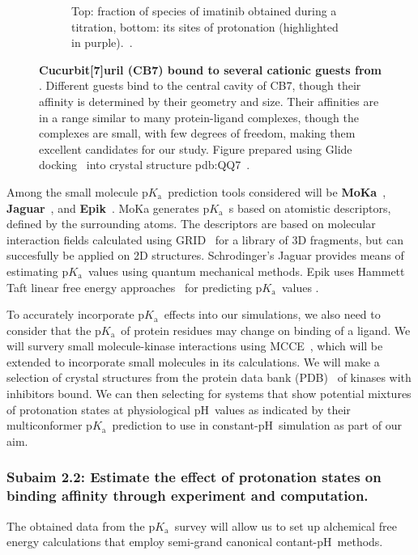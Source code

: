 \documentclass[10pt,final]{article}
\newcommand{\pKa}{p$K_\mathrm{a}$\ }
\newcommand{\pH}{p$\mathrm{H}$\ }
\begin{document}
\begin{figure}[H]
\begin{subfigure}{.5\textwidth}
  \caption{Top: fraction of species of imatinib obtained during a titration, bottom: its sites of protonation (highlighted in purple).~\cite{Szakacs2005a}.}
  \label{fig:imatinib-pKa}
\end{subfigure}
\caption{\textbf{Cucurbit[7]uril (CB7) bound to several cationic guests from \textcite{Cao2013a}}.
Different guests bind to the central cavity of CB7, though their affinity is determined by their geometry and size.
Their affinities are in a range similar to many protein-ligand complexes, though the complexes are small, with few degrees of freedom, making them excellent candidates for our study.
Figure prepared using Glide docking~\cite{Halgren2004a,Friesner2004a,Friesner2006a,Schroedinger2014a} into crystal structure pdb:QQ7~\cite{Feng2004a}.}
\label{figure:kinase-pKa}
\end{figure}


Among the small molecule \pKa prediction tools considered will be \textbf{MoKa}~\cite{Milletti2007a}, \textbf{Jaguar}~\cite{Bochevarov2013a}, and \textbf{Epik}~\cite{Shelley2007a,Greenwood2010a}.
MoKa generates \pKa{}s based on atomistic descriptors, defined by the surrounding atoms. The descriptors are based on molecular interaction fields calculated using GRID~\cite{Goodford1985a} for a library of 3D fragments, but can succesfully be applied on 2D structures.
Schrodinger's Jaguar provides means of estimating \pKa values using quantum mechanical methods.
Epik uses Hammett Taft linear free energy approaches~\cite{Perrin1981a} for predicting \pKa values .

To accurately incorporate \pKa effects into our simulations, we also need to consider that the \pKa of protein residues may change on binding of a ligand.
%
We will survery small molecule-kinase interactions using MCCE~\cite{Song2009a}, which will be extended to incorporate small molecules in its calculations.
%
We will make a selection of crystal structures from the protein data bank (PDB)~\cite{Berman2000a} of kinases with inhibitors bound.
%
We can then selecting for systems that show potential mixtures of protonation states at physiological \pH values as indicated by their multiconformer \pKa prediction to use in constant-\pH simulation as part of our aim. 


\subsubsection*{Subaim 2.2: Estimate the effect of protonation states on binding affinity through experiment and computation.}
The obtained data from the \pKa survey will allow us to set up alchemical free energy calculations that employ semi-grand canonical contant-\pH methods.~\cite{Mongan2004a}
\end{document}
